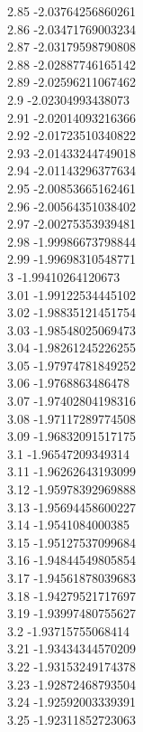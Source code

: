 {2.85	-2.03764256860261\\
2.86	-2.03471769003234\\
2.87	-2.03179598790808\\
2.88	-2.02887746165142\\
2.89	-2.02596211067462\\
2.9	-2.02304993438073\\
2.91	-2.02014093216366\\
2.92	-2.01723510340822\\
2.93	-2.01433244749018\\
2.94	-2.01143296377634\\
2.95	-2.00853665162461\\
2.96	-2.00564351038402\\
2.97	-2.00275353939481\\
2.98	-1.99986673798844\\
2.99	-1.99698310548771\\
3	-1.99410264120673\\
3.01	-1.99122534445102\\
3.02	-1.98835121451754\\
3.03	-1.98548025069473\\
3.04	-1.98261245226255\\
3.05	-1.97974781849252\\
3.06	-1.9768863486478\\
3.07	-1.97402804198316\\
3.08	-1.97117289774508\\
3.09	-1.96832091517175\\
3.1	-1.96547209349314\\
3.11	-1.96262643193099\\
3.12	-1.95978392969888\\
3.13	-1.95694458600227\\
3.14	-1.9541084000385\\
3.15	-1.95127537099684\\
3.16	-1.94844549805854\\
3.17	-1.94561878039683\\
3.18	-1.94279521717697\\
3.19	-1.93997480755627\\
3.2	-1.93715755068414\\
3.21	-1.93434344570209\\
3.22	-1.93153249174378\\
3.23	-1.92872468793504\\
3.24	-1.92592003339391\\
3.25	-1.92311852723063\\
}
